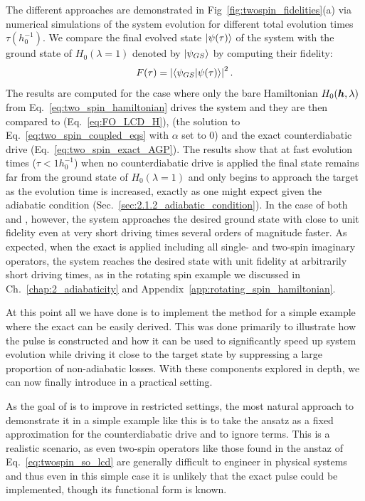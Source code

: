 The different approaches are demonstrated in Fig~\ref{fig:twospin_fidelities}(a) via numerical simulations of the system evolution for different total evolution times $\tau (h_0^{-1})$. We compare the final evolved state $\ket{\psi(\tau)}$ of the system with the ground state of $H_0(\lambda = 1)$ denoted by $\ket{\psi_{GS}}$ by computing their fidelity:
\begin{equation}
    F(\tau) = \left|\braket{\psi_{GS}}{\psi(\tau)}\right|^2.
\end{equation}
The results are computed for the case where only the bare Hamiltonian $H_0(\boldsymbol{h}, \lambda)$ from Eq.~\ref{eq:two_spin_hamiltonian} drives the system and they are then compared to   (Eq.~\eqref{eq:FO_LCD_H}),   (the solution to Eq.~\eqref{eq:two_spin_coupled_eqs} with $\alpha$ set to $0$) and the exact counterdiabatic drive (Eq.~\eqref{eq:two_spin_exact_AGP}). The results show that at fast evolution times ($\tau < 1 h_0^{-1}$) when no counterdiabatic drive is applied the final state remains far from the ground state of $H_0(\lambda = 1)$ and only begins to approach the target as the evolution time is increased, exactly as one might expect given the adiabatic condition (Sec.~\ref{sec:2.1.2_adiabatic_condition}). In the case of both  and  , however, the system approaches the desired ground state with close to unit fidelity even at very short driving times several orders of magnitude faster. As expected, when the exact  is applied including all single- and two-spin imaginary operators, the system reaches the desired state with unit fidelity at arbitrarily short driving times, as in the rotating spin example we discussed in Ch.~\ref{chap:2_adiabaticity} and Appendix~\ref{app:rotating_spin_hamiltonian}.

At this point all we have done is to implement the  method for a simple example where the exact  can be easily derived. This was done primarily to illustrate how the  pulse is constructed and how it can be used to significantly speed up system evolution while driving it close to the target state by suppressing a large proportion of non-adiabatic losses. With these components explored in depth, we can now finally introduce  in a practical setting.

As the goal of  is to improve  in restricted settings, the most natural approach to demonstrate it in a simple example like this is to take the   ansatz as a fixed approximation for the counterdiabatic drive and to ignore  terms. This is a realistic scenario, as even two-spin operators like those found in the   anstaz of Eq.~\eqref{eq:twospin_so_lcd} are generally difficult to engineer in physical systems  and thus even in this simple case it is unlikely that the exact  pulse could be implemented, though its functional form is known.

